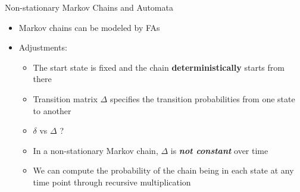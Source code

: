 \documentclass[10pt, aspectratio=169]{beamer}
\begin{document}
\begin{frame}{Non-stationary Markov Chains and Automata}
    \begin{itemize}
        \setlength{\itemsep}{12pt}
         \item Markov chains can be modeled by FAs
         \item Adjustments:
         \vspace{0.6em}
            \begin{itemize}
            \setlength{\itemsep}{4pt}
                \item The start state is fixed and the chain \textbf{deterministically} starts from there
                \item \textcolor{umBlueLighter}{Transition matrix $\Delta$} specifies the transition probabilities from one state to another
                \item $\delta$ vs $\Delta$ ?
                \item In a non-stationary Markov chain, $\Delta$ is \textbf{\textit{not constant}} over time
                \item We can compute the probability of the chain being in each state at any time point through recursive multiplication
            \end{itemize}
    \end{itemize}
\end{frame}
\end{document}
